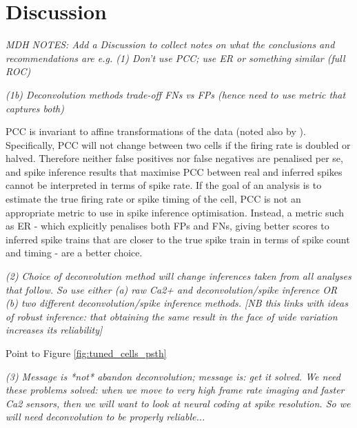 \documentclass[a4paper,10pt,twocolumn]{article}
\begin{document}







\section{Discussion}
\emph{MDH NOTES: Add a Discussion to collect notes on what the conclusions and recommendations are e.g.
(1) Don’t use PCC; use ER or something similar (full ROC)}

\emph{(1b) Deconvolution methods trade-off FNs vs FPs (hence need to use metric that captures both)}

PCC is invariant to affine transformations of the data (noted also by \citep{Theis2016-ee}). Specifically, PCC will not change between two cells if the firing rate is doubled or halved. Therefore neither false positives nor false negatives are penalised per se, and spike inference results that maximise PCC between real and inferred spikes cannot be interpreted in terms of spike rate. If the goal of an analysis is to estimate the true firing rate or spike timing of the cell, PCC is not an appropriate metric to use in spike inference optimisation. Instead, a metric such as ER - which explicitly penalises both FPs and FNs, giving better scores to inferred spike trains that are closer to the true spike train in terms of spike count and timing - are a better choice.


\emph{(2) Choice of deconvolution method will change inferences taken from all analyses that follow. So use either (a) raw Ca2+ and deconvolution/spike inference OR (b) two different deconvolution/spike inference methods. [NB this links with ideas of robust inference: that obtaining the same result in the face of wide variation increases its reliability]}

Point to Figure \ref{fig:tuned_cells_psth}

\emph{(3) Message is *not* abandon deconvolution; message is: get it solved. We need these problems solved: when we move to very high frame rate imaging and faster Ca2 sensors, then we will want to look at neural coding at spike resolution. So we will need deconvolution to be properly reliable...}
\end{document}
